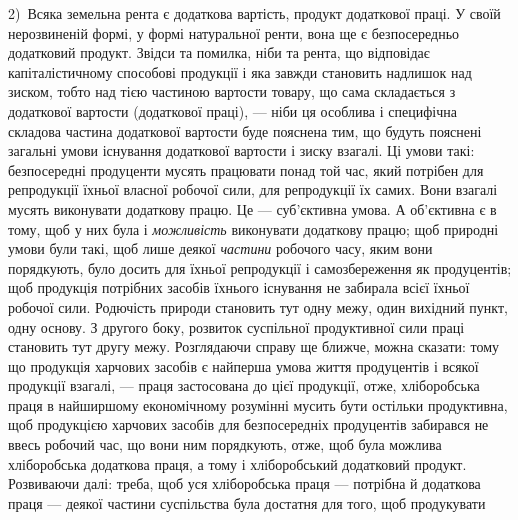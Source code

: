 2)~Всяка земельна рента є додаткова вартість, продукт додаткової праці.
У своїй нерозвиненій формі, у формі натуральної ренти, вона ще є безпосередньо
додатковий продукт. Звідси та помилка, ніби та рента, що відповідає капіталістичному
способові продукції і яка завжди становить надлишок над зиском,
тобто над тією частиною вартости товару, що сама складається з додаткової вартости
(додаткової праці), — ніби ця особлива і специфічна складова частина додаткової
вартости буде пояснена тим, що будуть пояснені загальні умови існування додаткової
вартости і зиску взагалі. Ці умови такі: безпосередні продуценти мусять працювати
понад той час, який потрібен для репродукції їхньої власної робочої
сили, для репродукції їх самих. Вони взагалі мусять виконувати додаткову працю.
Це — суб’єктивна умова. А об’єктивна є в тому, щоб у них була і \emph{можливість}
виконувати додаткову працю; щоб природні умови були такі, щоб лише деякої
\emph{частини} робочого часу, яким вони порядкують, було досить для їхньої репродукції
і самозбереження як продуцентів; щоб продукція потрібних засобів їхнього
існування не забирала всієї їхньої робочої сили. Родючість природи становить
тут одну межу, один вихідний пункт, одну основу. З другого боку, розвиток суспільної
продуктивної сили праці становить тут другу межу. Розглядаючи справу
ще ближче, можна сказати: тому що продукція харчових засобів є найперша умова
життя продуцентів і всякої продукції взагалі, — праця застосована до цієї продукції,
отже, хліборобська праця в найширшому економічному розумінні мусить бути
остільки продуктивна, щоб продукцією харчових засобів для безпосередніх продуцентів
забирався не ввесь робочий час, що вони ним порядкують, отже, щоб була
можлива хліборобська додаткова праця, а тому і хліборобський додатковий продукт.
Розвиваючи далі: треба, щоб уся хліборобська праця — потрібна й додаткова
праця — деякої частини суспільства була достатня для того, щоб продукувати
\parbreak{}  %
